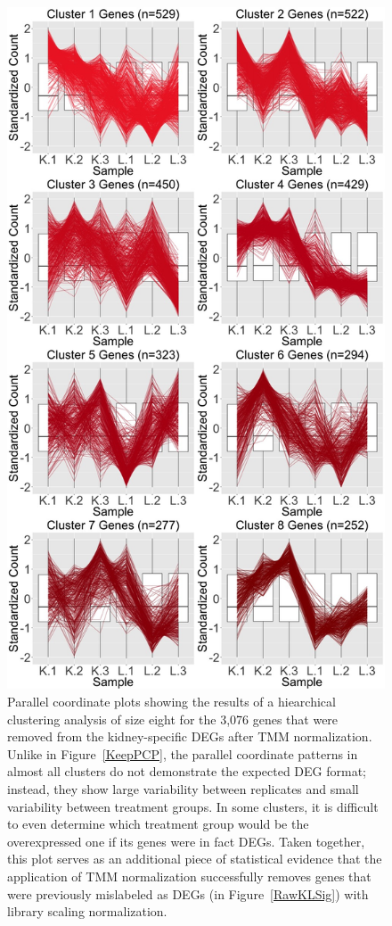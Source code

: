 \documentclass{article}
\begin{document}
\begin{figure}[!p]
\centerline{\includegraphics[width=1\columnwidth]{../Bioinformatics/Pictures/liverKidney/Clustering_data_FDR_001_TMMvRaw_Removed/K_L_8.jpg}}
\caption{Parallel coordinate plots showing the results of a hiearchical clustering analysis of size eight for the 3,076 genes that were removed from the kidney-specific DEGs after TMM normalization. Unlike in Figure~\ref{KeepPCP}, the parallel coordinate patterns in almost all clusters do not demonstrate the expected DEG format; instead, they show large variability between replicates and small variability between treatment groups. In some clusters, it is difficult to even determine which treatment group would be the overexpressed one if its genes were in fact DEGs. Taken together, this plot serves as an additional piece of statistical evidence that the application of TMM normalization successfully removes genes that were previously mislabeled as DEGs (in Figure~\ref{RawKLSig}) with library scaling normalization.
\label{RemovePCP}}
\end{figure}
\end{document}
